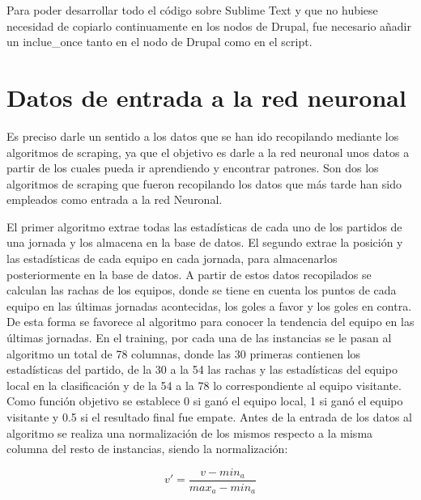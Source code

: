 Para poder desarrollar todo el código sobre Sublime Text y que no hubiese necesidad de copiarlo continuamente en los nodos de Drupal, fue necesario añadir un inclue\_once tanto en el nodo de Drupal como en el script.

\section{Datos de entrada a la red neuronal}
Es preciso darle un sentido a los datos que se han ido recopilando mediante los algoritmos de scraping, ya que el objetivo es darle a la red neuronal unos datos a partir de los cuales pueda ir aprendiendo y encontrar patrones. Son dos los algoritmos de scraping que fueron recopilando los datos que más tarde han sido empleados como entrada a la red Neuronal.

El primer algoritmo extrae todas las estadísticas de cada uno de los partidos de una jornada y los almacena en la base de datos. El segundo extrae la posición y las estadísticas de cada equipo en cada jornada, para almacenarlos posteriormente en la base de datos. A partir de estos datos recopilados se calculan las rachas de los equipos, donde se tiene en cuenta los puntos de cada equipo en las últimas jornadas acontecidas, los goles a favor y  los goles en contra. De esta forma se favorece al algoritmo para conocer la tendencia del equipo en las últimas jornadas. En el training, por cada una de las instancias se le pasan al algoritmo un total de 78 columnas, donde las 30 primeras contienen los estadísticas del partido, de la 30 a la 54 las rachas y las estadísticas del equipo local en la clasificación y de la 54 a la 78 lo correspondiente al equipo visitante. Como función objetivo se establece 0 si ganó el equipo local, 1 si ganó el equipo visitante y 0.5 si el resultado final fue empate.
Antes de la entrada de los datos al algoritmo se realiza una normalización de los mismos respecto a la misma columna del resto de instancias, siendo la normalización:
\begin{center}
\large{$$v' = \frac{v-min_{a}}{max_{a}-min_{a}}$$}
\end{center}


